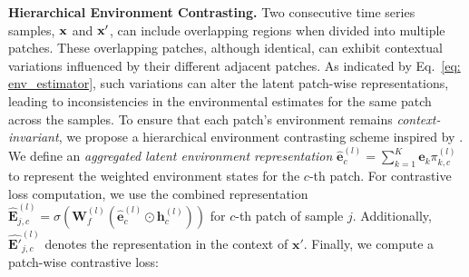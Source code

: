 {\noindent\textbf{Hierarchical Environment Contrasting.}
Two consecutive time series samples, ${\bf x}$ and ${\bf x}'$, can include overlapping regions when divided into multiple patches. These overlapping patches, although identical, can exhibit contextual variations influenced by their different adjacent patches. As indicated by Eq.~\eqref{eq: env_estimator}, such variations can alter the latent patch-wise representations, leading to inconsistencies in the environmental estimates for the same patch across the samples.
To ensure that each patch's environment remains \textit{context-invariant}, we propose a hierarchical environment contrasting scheme inspired by \citet{yue2022ts2vec}. We define an \textit{aggregated latent environment representation} \( \hat{\mathbf{e}}^{(l)}_c = \sum_{k=1}^{K} \mathbf{e}_k \pi_{k, c}^{(l)} \) to represent the weighted environment states for the \( c \)-th patch. For contrastive loss computation, we use the combined representation \( \hat{\mathbf{E}}_{j,c}^{(l)} = \sigma(\mathbf{W}_f^{(l)} (\hat{\mathbf{e}}^{(l)}_c \odot \mathbf{h}^{(l)}_c)) \) for $c$-th patch of sample $j$. Additionally, \( \hat{\mathbf{E}'}_{j,c}^{(l)} \) denotes the representation in the context of \( \mathbf{x}' \). Finally, we compute a patch-wise contrastive loss:
}
